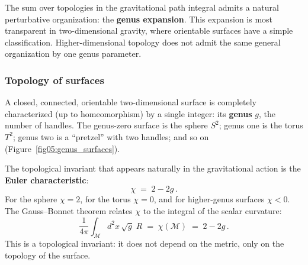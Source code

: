 \documentclass[11pt,letterpaper]{article}
\theoremstyle{plain}
\theoremstyle{definition}
\theoremstyle{remark}
\begin{document}
The sum over topologies in the gravitational path integral admits a natural
perturbative organization: the \textbf{genus expansion}.  This expansion is most
transparent in two-dimensional gravity, where orientable surfaces have
a simple classification. Higher-dimensional topology does not admit the
same general organization by one genus parameter.

\subsubsection*{Topology of surfaces}

A closed, connected, orientable two-dimensional surface is completely
characterized (up to homeomorphism) by a single integer: its \textbf{genus} $g$,
the number of handles.  The genus-zero surface is the sphere $S^2$; genus one is
the torus $T^2$; genus two is a ``pretzel'' with two handles; and so on
(Figure~\ref{fig05:genus_surfaces}).

The topological invariant that appears naturally in the gravitational action is
the \textbf{Euler characteristic}:
\begin{equation}\label{eq05:euler_characteristic}
  \chi \;=\; 2 - 2g\,.
\end{equation}
For the sphere $\chi = 2$, for the torus $\chi = 0$, and for higher-genus
surfaces $\chi < 0$.  The Gauss--Bonnet theorem relates $\chi$ to the integral
of the scalar curvature:
\begin{equation}\label{eq05:gauss_bonnet}
  \frac{1}{4\pi}\int_{\mathcal{M}} d^2x\,\sqrt{g}\; R
  \;=\; \chi(\mathcal{M}) \;=\; 2 - 2g\,.
\end{equation}
This is a topological invariant: it does not depend on the metric, only on the
topology of the surface.
\end{document}
